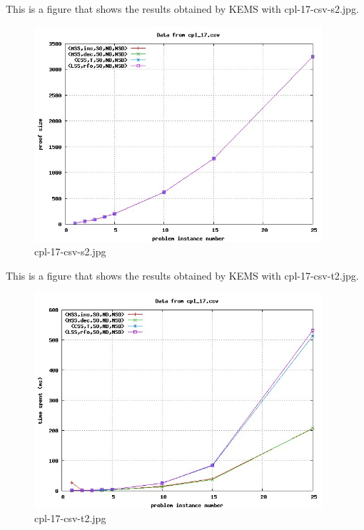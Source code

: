 This is a figure that shows the results obtained by KEMS with cpl-17-csv-s2.jpg.
\begin{figure}[htbp]
\begin{center}
\includegraphics[width=0.95\textwidth]{figuras/cpl-17-csv-s2.jpg}
\end{center}
\caption{cpl-17-csv-s2.jpg}
\end{figure}

This is a figure that shows the results obtained by KEMS with cpl-17-csv-t2.jpg.
\begin{figure}[htbp]
\begin{center}
\includegraphics[width=0.95\textwidth]{figuras/cpl-17-csv-t2.jpg}
\end{center}
\caption{cpl-17-csv-t2.jpg}
\end{figure}

